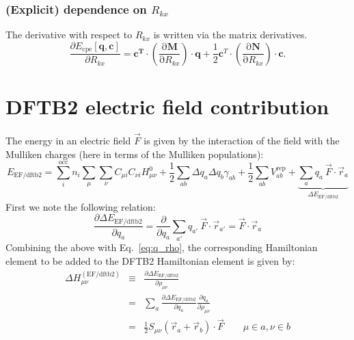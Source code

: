 \documentclass{article}
\numberwithin{equation}{section}
\begin{document}
\subsubsection{(Explicit) dependence on $R_{kx}$}
The derivative with respect to $R_{kx}$ is written via the matrix derivatives.
\begin{equation}
    \frac{\partial E_\mathrm{{cpe}}\left[\mathbf{q}, \mathbf{c}\right]}{\partial R_{kx}} = 
    \mathbf{c^T} \cdot \left( \frac{\mathrm{\partial}\mathbf{M}}{\mathrm{\partial}R_{kx}}\right) \cdot \mathbf{q} 
    + \frac{1}{2}\mathbf{c}^T \cdot \left( \frac{\mathrm{\partial}\mathbf{N}}{\mathrm{\partial}R_{kx}}\right) \cdot \mathbf{c}. 
\end{equation}


\clearpage
\section{DFTB2 electric field contribution}
The energy in an electric field $\vec{F}$ is given by the interaction of the field with the Mulliken charges (here in terms of the Mulliken populations):
\begin{equation}
    E_\mathrm{EF/dftb2} = \sum_i^\mathrm{occ} n_i  \sum_\mu \sum_\nu C_{\mu i}  C_{\nu i} H^0_{\mu\nu} + \frac{1}{2} \sum_{ab} \Delta q_a \Delta q_b \gamma_{ab}+ \frac{1}{2} \sum_{ab} V^\mathrm{rep}_{ab} + \underbrace{\sum_a q_a\ \vec{F} \cdot \vec{r}_a}_{\Delta E_{\mathrm{EF/dftb2}}}\label{eq:dftb_ef_energy}
\end{equation}
First we note the following relation:
\begin{equation}
    \frac{\partial \Delta E_{\mathrm{EF/dftb2}}}{\partial q_a}
    = \frac{\partial}{\partial q_a} \sum_{a'} q_{a'}\ \vec{F} \cdot \vec{r}_{a'} = \vec{F} \cdot \vec{r}_a
\end{equation}
Combining the above with Eq.~\ref{eq:q_rho}, the corresponding Hamiltonian element to be added to the DFTB2 Hamiltonian element is given by:
\begin{eqnarray}
    \Delta H_{\mu\nu}^{\mathrm{(EF/dftb2)}} 
    &\equiv& \frac{\partial \Delta  E_{\mathrm{EF/dftb2}}}{\partial \rho_{\mu\nu}}\nonumber\\
    &=&  \sum_a \frac{\partial \Delta  E_{\mathrm{EF/dftb2}}}{\partial q_a} 
     \frac{\partial q_a}{\partial \rho_{\mu\nu}}\nonumber\\
     &=& \frac{1}{2} S_{\mu\nu} \left( \vec{r}_a + \vec{r}_b
 \right) \cdot \vec{F}  \qquad \mu \in a, \nu \in b
\end{eqnarray}
\end{document}
